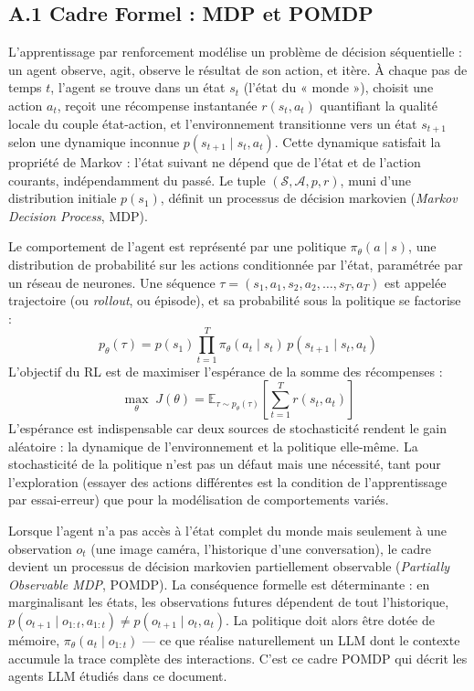 \documentclass[11pt,a4paper]{article}
\begin{document}
\subsection*{A.1 Cadre Formel : MDP et POMDP}
L'apprentissage par renforcement modélise un problème de décision séquentielle : un agent observe, agit, observe le résultat de son action, et itère. À chaque pas de temps $t$, l'agent se trouve dans un état $s_t$ (l'état du « monde »), choisit une action $a_t$, reçoit une récompense instantanée $r(s_t, a_t)$ quantifiant la qualité locale du couple état-action, et l'environnement transitionne vers un état $s_{t+1}$ selon une dynamique inconnue $p(s_{t+1} \mid s_t, a_t)$. Cette dynamique satisfait la propriété de Markov : l'état suivant ne dépend que de l'état et de l'action courants, indépendamment du passé. Le tuple $(\mathcal{S}, \mathcal{A}, p, r)$, muni d'une distribution initiale $p(s_1)$, définit un processus de décision markovien (\emph{Markov Decision Process}, MDP).

Le comportement de l'agent est représenté par une politique $\pi_\theta(a \mid s)$, une distribution de probabilité sur les actions conditionnée par l'état, paramétrée par un réseau de neurones. Une séquence $\tau = (s_1, a_1, s_2, a_2, \dots, s_T, a_T)$ est appelée trajectoire (ou \emph{rollout}, ou épisode), et sa probabilité sous la politique se factorise :
\begin{equation}
p_\theta(\tau) = p(s_1) \prod_{t=1}^{T} \pi_\theta(a_t \mid s_t)\, p(s_{t+1} \mid s_t, a_t)
\end{equation}
L'objectif du RL est de maximiser l'espérance de la somme des récompenses :
\begin{equation}
\max_\theta \; J(\theta) = \mathbb{E}_{\tau \sim p_\theta(\tau)} \left[ \sum_{t=1}^{T} r(s_t, a_t) \right]
\label{eq:rl_objective}
\end{equation}
L'espérance est indispensable car deux sources de stochasticité rendent le gain aléatoire : la dynamique de l'environnement et la politique elle-même. La stochasticité de la politique n'est pas un défaut mais une nécessité, tant pour l'exploration (essayer des actions différentes est la condition de l'apprentissage par essai-erreur) que pour la modélisation de comportements variés.

Lorsque l'agent n'a pas accès à l'état complet du monde mais seulement à une observation $o_t$ (une image caméra, l'historique d'une conversation), le cadre devient un processus de décision markovien partiellement observable (\emph{Partially Observable MDP}, POMDP). La conséquence formelle est déterminante : en marginalisant les états, les observations futures dépendent de tout l'historique, $p(o_{t+1} \mid o_{1:t}, a_{1:t}) \neq p(o_{t+1} \mid o_t, a_t)$. La politique doit alors être dotée de mémoire, $\pi_\theta(a_t \mid o_{1:t})$ — ce que réalise naturellement un LLM dont le contexte accumule la trace complète des interactions. C'est ce cadre POMDP qui décrit les agents LLM étudiés dans ce document.
\end{document}

